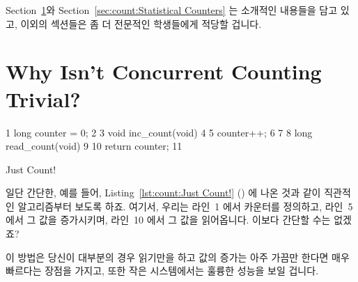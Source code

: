 Section~\ref{sec:count:Why Isn't Concurrent Counting Trivial?}와
Section~\ref{sec:count:Statistical Counters} 는 소개적인 내용들을 담고 있고,
이외의 섹션들은 좀 더 전문적인 학생들에게 적당할 겁니다.

\section{Why Isn't Concurrent Counting Trivial?}
\label{sec:count:Why Isn't Concurrent Counting Trivial?}

\begin{listing}[bp]
{ \scriptsize
\begin{verbbox}
  1 long counter = 0;
  2 
  3 void inc_count(void)
  4 {
  5   counter++;
  6 }
  7 
  8 long read_count(void)
  9 {
 10   return counter;
 11 }
\end{verbbox}
}
\centering
\theverbbox
\caption{Just Count!}
\label{lst:count:Just Count!}
\end{listing}

일단 간단한, 예를 들어,
Listing~\ref{lst:count:Just Count!} ()
에 나온 것과 같이 직관적인 알고리즘부터 보도록 하죠.
여기서, 우리는 라인~1 에서 카운터를 정의하고, 라인~5 에서 그 값을 증가시키며,
라인~10 에서 그 값을 읽어옵니다.
이보다 간단할 수는 없겠죠?

이 방법은 당신이 대부분의 경우 읽기만을 하고 값의 증가는 아주 가끔만 한다면
매우 빠르다는 장점을 가지고, 또한 작은 시스템에서는 훌륭한 성능을 보일 겁니다.
\iffalse

